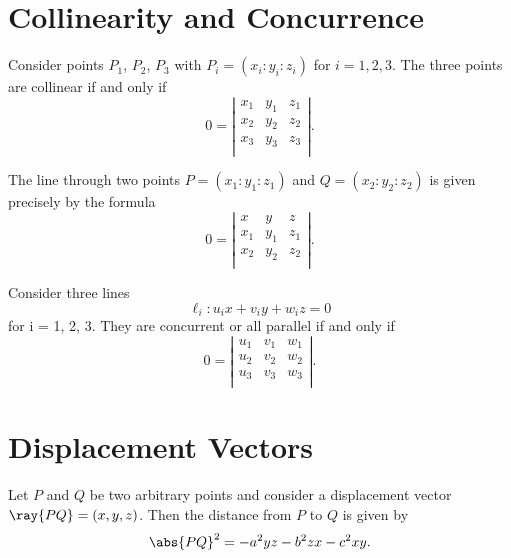\documentclass[11pt]{scrartcl}
\begin{document}
\pagebreak
\section{Collinearity and Concurrence}
\begin{theorem}
  [Collinearity]
  Consider points $P_1$, $P_2$, $P_3$ with $P_i = (x_i : y_i : z_i)$ for $i = 1, 2, 3$. The three points are collinear if and only if
  \[0 =
    \left\lvert
    \begin{array}{ccc}
      x_1 & y_1 & z_1 \\
      x_2 & y_2 & z_2 \\
      x_3 & y_3 & z_3 \\
    \end{array}
    \right\rvert.
  \]
\end{theorem}

\begin{proposition}
  The line through two points $P = (x_1 : y_1 : z_1)$ and $Q = (x_2 : y_2 : z_2)$ is given precisely by the formula
    \[0 =
    \left\lvert
    \begin{array}{ccc}
      x & y & z \\
      x_1 & y_1 & z_1 \\
      x_2 & y_2 & z_2 \\
    \end{array}
    \right\rvert.
  \]
\end{proposition}

\begin{theorem}
  [Concurrence]
  Consider three lines
  \[\ell_i : u_ix + v_iy + w_iz = 0\]
  for i = 1, 2, 3. They are concurrent or all parallel if and only if
    \[0=
    \left\lvert
    \begin{array}{ccc}
      u_1 & v_1 & w_1 \\
      u_2 & v_2 & w_2 \\
      u_3 & v_3 & w_3 \\
    \end{array}
    \right\rvert.
  \]
\end{theorem}

\section{Displacement Vectors}
\begin{theorem}
  Let $P$ and $Q$ be two arbitrary points and consider a displacement vector $\ray{PQ} = (x, y, z)$. Then the distance from $P$ to $Q$ is given by
  \[\abs{PQ}^2=-a^2yz-b^2zx-c^2xy.\]
\end{theorem}
\end{document}
